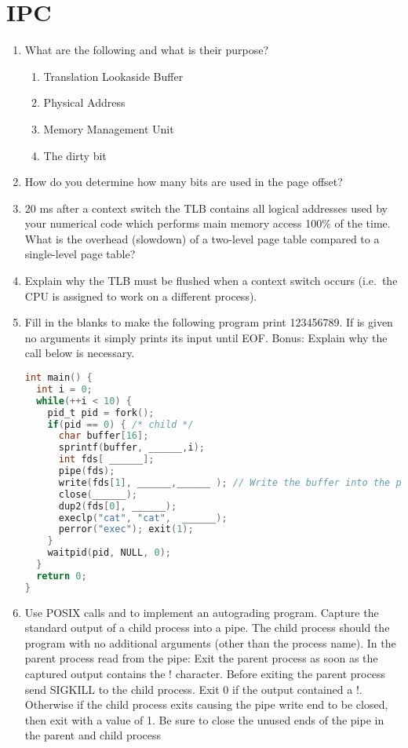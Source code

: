 \section{IPC}

\begin{enumerate}

\item What are the following and what is their purpose?
  \begin{enumerate}
  \item Translation Lookaside Buffer
  \item Physical Address
  \item Memory Management Unit
  \item The dirty bit
  \end{enumerate}

\item How do you determine how many bits are used in the page offset?

\item 20 ms after a context switch the TLB contains all logical addresses used by your numerical code which performs main memory access 100\% of the time. What is the overhead (slowdown) of a two-level page table compared to a single-level page table?

\item Explain why the TLB must be flushed when a context switch occurs (i.e.~the CPU is assigned to work on a different process).

\item Fill in the blanks to make the following program print 123456789. If  is given no arguments it simply prints its input until EOF. Bonus: Explain why the  call below is necessary.

\begin{lstlisting}[language=C]
int main() {
  int i = 0;
  while(++i < 10) {
    pid_t pid = fork();
    if(pid == 0) { /* child */
      char buffer[16];
      sprintf(buffer, ______,i);
      int fds[ ______];
      pipe(fds);
      write(fds[1], ______,______ ); // Write the buffer into the pipe
      close(______);
      dup2(fds[0], ______);
      execlp("cat", "cat",  ______);
      perror("exec"); exit(1);
    }
    waitpid(pid, NULL, 0);
  }
  return 0;
}
\end{lstlisting}

\item Use POSIX calls    and  to implement an autograding program.
  Capture the standard output of a child process into a pipe.
  The child process should  the program  with no additional arguments (other than the process name).
  In the parent process read from the pipe: Exit the parent process as soon as the captured output contains the !
  character.
  Before exiting the parent process send SIGKILL to the child process.
  Exit 0 if the output contained a !.
  Otherwise if the child process exits causing the pipe write end to be closed, then exit with a value of 1.
  Be sure to close the unused ends of the pipe in the parent and child process


\end{enumerate}
